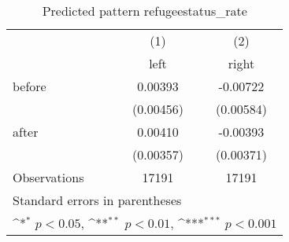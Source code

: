 \begin{table}[htbp]\centering
\def\sym#1{\ifmmode^{#1}\else\(^{#1}\)\fi}
\caption{Predicted pattern refugeestatus\_rate}
\begin{tabular}{l*{2}{c}}
\hline\hline
                    &\multicolumn{1}{c}{(1)}&\multicolumn{1}{c}{(2)}\\
                    &\multicolumn{1}{c}{left}&\multicolumn{1}{c}{right}\\
\hline
before              &     0.00393         &    -0.00722         \\
                    &   (0.00456)         &   (0.00584)         \\
[1em]
after               &     0.00410         &    -0.00393         \\
                    &   (0.00357)         &   (0.00371)         \\
\hline
Observations        &       17191         &       17191         \\
\hline\hline
\multicolumn{3}{l}{\footnotesize Standard errors in parentheses}\\
\multicolumn{3}{l}{\footnotesize \sym{*} \(p<0.05\), \sym{**} \(p<0.01\), \sym{***} \(p<0.001\)}\\
\end{tabular}
\end{table}

